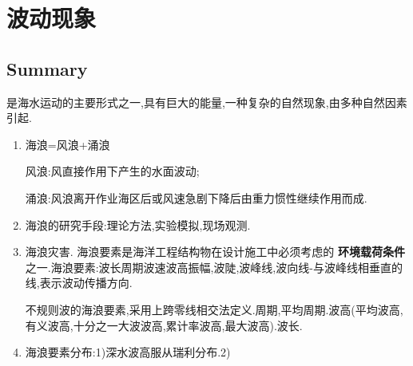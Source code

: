 \section{波动现象}
	\subsection{Summary}
	 是海水运动的主要形式之一,具有巨大的能量,一种复杂的自然现象,由多种自然因素引起.
	\begin{enumerate}
		
		\item
		海浪=风浪+涌浪 
		
		风浪:风直接作用下产生的水面波动; 
		
		涌浪:风浪离开作业海区后或风速急剧下降后由重力惯性继续作用而成.
		
		
		\item 海浪的研究手段:理论方法,实验模拟,现场观测.
		
		\item 海浪灾害. 海浪要素是海洋工程结构物在设计施工中必须考虑的 \textbf{环境载荷条件} 之一.海浪要素:波长周期波速波高振幅,波陡,波峰线,波向线-与波峰线相垂直的线,表示波动传播方向.
		
		 不规则波的海浪要素,采用上跨零线相交法定义.周期,平均周期.波高(平均波高,有义波高,十分之一大波波高,累计率波高,最大波高).波长.
		 
		\item 海浪要素分布:1)深水波高服从瑞利分布.2)
	\end{enumerate}
		

